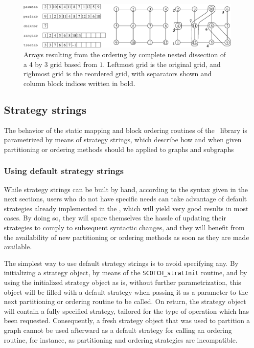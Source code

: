 \begin{figure}
\centering\includegraphics[scale=0.47]{p_f_orb.eps}
\caption{Arrays resulting from the ordering by complete nested
dissection of a 4 by 3 grid based from $1$. Leftmost grid is the
original grid, and righmost grid is the reordered grid, with
separators shown and column block indices written in bold.}
\label{fig-lib-ord-block}
\end{figure}

\subsection{Strategy strings}

The behavior of the static mapping and block ordering routines of the
\libscotch\ library is parametrized by means of strategy strings,
which describe how and when given partitioning or ordering methods
should be applied to graphs and subgraphs

\subsubsection{Using default strategy strings}
\label{sec-lib-format-strat-default}

While strategy strings can be built by hand, according to the syntax
given in the next sections, users who do not have specific needs can
take advantage of default strategies already implemented in the
\libscotch, which will yield very good results in most cases. By
doing so, they will spare themselves the hassle of updating their
strategies to comply to subsequent syntactic changes, and they will
benefit from the availability of new partitioning or ordering methods
as soon as they are made available.

The simplest way to use default strategy strings is to avoid
specifying any. By initializing a strategy object, by means of the
{\tt SCOTCH\_\lbt stratInit} routine, and by using the initialized
strategy object as is, without further parametrization, this object
will be filled with a default strategy when passing it as a parameter
to the next partitioning or ordering routine to be called. On return,
the strategy object will contain a fully specified strategy, tailored
for the type of operation which has been requested. Consequently, a
fresh strategy object that was used to partition a graph cannot be
used afterward as a default strategy for calling an ordering routine,
for instance, as partitioning and ordering strategies are incompatible.

